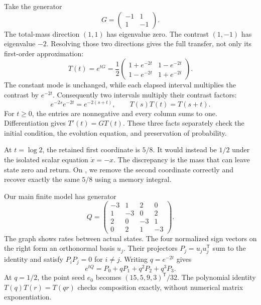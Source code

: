 Take the generator
\[
G=\begin{pmatrix}-1&1\\1&-1\end{pmatrix}.
\]
The total-mass direction $(1,1)$ has eigenvalue zero. The contrast $(1,-1)$ has eigenvalue $-2$. Resolving those two directions gives the full transfer, not only its first-order approximation:
\[
T(t)=e^{tG}=\frac12\begin{pmatrix}1+e^{-2t}&1-e^{-2t}\\1-e^{-2t}&1+e^{-2t}\end{pmatrix}.
\]
The constant mode is unchanged, while each elapsed interval multiplies the contrast by $e^{-2t}$. Consequently two intervals multiply their contrast factors:
\[
e^{-2s}e^{-2t}=e^{-2(s+t)},\qquad T(s)T(t)=T(s+t).
\]
For $t\ge0$, the entries are nonnegative and every column sums to one. Differentiation gives $T'(t)=GT(t)$. These three facts separately check the initial condition, the evolution equation, and preservation of probability.

At $t=\log 2$, the retained first coordinate is $5/8$. It would instead be $1/2$ under the isolated scalar equation $\dot x=-x$. The discrepancy is the mass that can leave state zero and return. On , we remove the second coordinate correctly and recover exactly the same $5/8$ using a memory integral.

Our main finite model has generator
\[
Q=\begin{pmatrix}-3&1&2&0\\1&-3&0&2\\2&0&-3&1\\0&2&1&-3\end{pmatrix}.
\]
The graph shows rates between actual states. The four normalized sign vectors on the right form an orthonormal basis $u_j$. Their projectors $P_j=u_ju_j^{\mathsf T}$ sum to the identity and satisfy $P_iP_j=0$ for $i\ne j$.
Writing $q=e^{-2t}$ gives
\[
e^{tQ}=P_0+qP_1+q^2P_2+q^3P_3.
\]
At $q=1/2$, the point seed $e_0$ becomes $(15,5,9,3)^{\mathsf T}/32$. The polynomial identity $T(q)T(r)=T(qr)$ checks composition exactly, without numerical matrix exponentiation.

